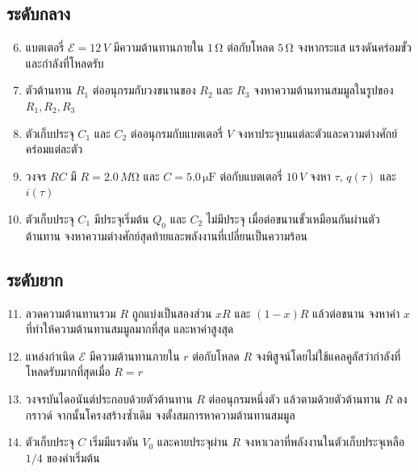 \subsection*{ระดับกลาง}

\begin{enumerate}
    \setcounter{enumi}{5}
    \item แบตเตอรี่ $\mathcal{E}=12\,\si{V}$ มีความต้านทานภายใน $1\,\si{\ohm}$ ต่อกับโหลด $5\,\si{\ohm}$ จงหากระแส แรงดันคร่อมขั้ว และกำลังที่โหลดรับ

    \item ตัวต้านทาน $R_1$ ต่ออนุกรมกับวงขนานของ $R_2$ และ $R_3$ จงหาความต้านทานสมมูลในรูปของ $R_1,R_2,R_3$

    \item ตัวเก็บประจุ $C_1$ และ $C_2$ ต่ออนุกรมกับแบตเตอรี่ $V$ จงหาประจุบนแต่ละตัวและความต่างศักย์คร่อมแต่ละตัว

    \item วงจร $RC$ มี $R=2.0\,\si{M\ohm}$ และ $C=5.0\,\si{\micro\farad}$ ต่อกับแบตเตอรี่ $10\,\si{V}$ จงหา $\tau$, $q(\tau)$ และ $i(\tau)$

    \item ตัวเก็บประจุ $C_1$ มีประจุเริ่มต้น $Q_0$ และ $C_2$ ไม่มีประจุ เมื่อต่อขนานขั้วเหมือนกันผ่านตัวต้านทาน จงหาความต่างศักย์สุดท้ายและพลังงานที่เปลี่ยนเป็นความร้อน
\end{enumerate}

\subsection*{ระดับยาก}

\begin{enumerate}
    \setcounter{enumi}{10}
    \item ลวดความต้านทานรวม $R$ ถูกแบ่งเป็นสองส่วน $xR$ และ $(1-x)R$ แล้วต่อขนาน จงหาค่า $x$ ที่ทำให้ความต้านทานสมมูลมากที่สุด และหาค่าสูงสุด

    \item แหล่งกำเนิด $\mathcal{E}$ มีความต้านทานภายใน $r$ ต่อกับโหลด $R$ จงพิสูจน์โดยไม่ใช้แคลคูลัสว่ากำลังที่โหลดรับมากที่สุดเมื่อ $R=r$

    \item วงจรบันไดอนันต์ประกอบด้วยตัวต้านทาน $R$ ต่ออนุกรมหนึ่งตัว แล้วตามด้วยตัวต้านทาน $R$ ลงกราวด์ จากนั้นโครงสร้างซ้ำเดิม จงตั้งสมการหาความต้านทานสมมูล

    \item ตัวเก็บประจุ $C$ เริ่มมีแรงดัน $V_0$ และคายประจุผ่าน $R$ จงหาเวลาที่พลังงานในตัวเก็บประจุเหลือ $1/4$ ของค่าเริ่มต้น
\end{enumerate}

